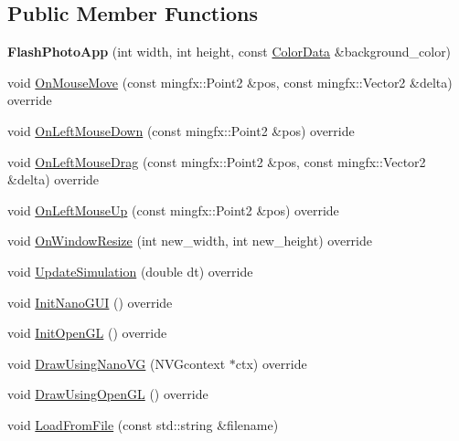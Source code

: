 \subsection*{Public Member Functions}
\begin{DoxyCompactItemize}
\item 
\mbox{\label{classimage__tools_1_1FlashPhotoApp_ae5fac55fc6210eb08bde89343170bfe0}} 
{\bfseries Flash\+Photo\+App} (int width, int height, const \hyperlink{classimage__tools_1_1ColorData}{Color\+Data} \&background\+\_\+color)
\item 
void \hyperlink{classimage__tools_1_1FlashPhotoApp_aba314de10932cab1acbf34debbbb9776}{On\+Mouse\+Move} (const mingfx\+::\+Point2 \&pos, const mingfx\+::\+Vector2 \&delta) override
\item 
void \hyperlink{classimage__tools_1_1FlashPhotoApp_af26aeb5420b9f123fba9330abc3ff907}{On\+Left\+Mouse\+Down} (const mingfx\+::\+Point2 \&pos) override
\item 
void \hyperlink{classimage__tools_1_1FlashPhotoApp_a900752c3758c9a92619a24b7c3e351e8}{On\+Left\+Mouse\+Drag} (const mingfx\+::\+Point2 \&pos, const mingfx\+::\+Vector2 \&delta) override
\item 
void \hyperlink{classimage__tools_1_1FlashPhotoApp_a63ce75bf69e79b7db32f07f0cd9c50b7}{On\+Left\+Mouse\+Up} (const mingfx\+::\+Point2 \&pos) override
\item 
void \hyperlink{classimage__tools_1_1FlashPhotoApp_afab3ded368aee035c7c229226048479a}{On\+Window\+Resize} (int new\+\_\+width, int new\+\_\+height) override
\item 
void \hyperlink{classimage__tools_1_1FlashPhotoApp_af69350137d0f9f7501853d23a72c7f4e}{Update\+Simulation} (double dt) override
\item 
void \hyperlink{classimage__tools_1_1FlashPhotoApp_a58a876833577928a4a361e9b14a03680}{Init\+Nano\+G\+UI} () override
\item 
void \hyperlink{classimage__tools_1_1FlashPhotoApp_a8824007bb6ed253f1b5a37d458ff2371}{Init\+Open\+GL} () override
\item 
void \hyperlink{classimage__tools_1_1FlashPhotoApp_abda3c07c67a29eba47e341bdf0223e7a}{Draw\+Using\+Nano\+VG} (N\+V\+Gcontext $\ast$ctx) override
\item 
void \hyperlink{classimage__tools_1_1FlashPhotoApp_a58e520556daa81224cb0a76a3fca9b78}{Draw\+Using\+Open\+GL} () override
\item 
void \hyperlink{classimage__tools_1_1FlashPhotoApp_aee942a00db0ff47ed36f4a78bf308482}{Load\+From\+File} (const std\+::string \&filename)

\end{DoxyCompactItemize}
